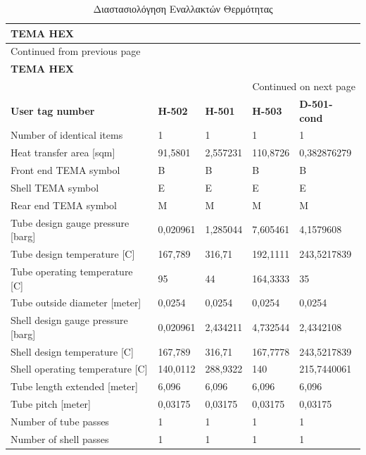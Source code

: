 \documentclass[11pt]{article}
\begin{document}
\begin{longtable}{lllll}
\caption{Διαστασιολόγηση Εναλλακτών Θερμότητας}
\\
\textbf{TEMA HEX} &  &  &  & \\
\hline
\endfirsthead
\multicolumn{5}{l}{Continued from previous page} \\
\hline

\textbf{TEMA HEX} &  &  &  &  \\

\hline
\endhead
\hline\multicolumn{5}{r}{Continued on next page} \\
\endfoot
\endlastfoot
\hline
\textbf{User tag number} & \textbf{H-502} & \textbf{H-501} & \textbf{H-503} & \textbf{D-501-cond}\\
Number of identical items & 1 & 1 & 1 & 1\\
Heat transfer area [sqm] & 91,5801 & 2,557231 & 110,8726 & 0,382876279\\
Front end TEMA symbol & B & B & B & B\\
Shell TEMA symbol & E & E & E & E\\
Rear end TEMA symbol & M & M & M & M\\
Tube design gauge pressure [barg] & 0,020961 & 1,285044 & 7,605461 & 4,1579608\\
Tube design temperature [C] & 167,789 & 316,71 & 192,1111 & 243,5217839\\
Tube operating temperature [C] & 95 & 44 & 164,3333 & 35\\
Tube outside diameter [meter] & 0,0254 & 0,0254 & 0,0254 & 0,0254\\
Shell design gauge pressure [barg] & 0,020961 & 2,434211 & 4,732544 & 2,4342108\\
Shell design temperature [C] & 167,789 & 316,71 & 167,7778 & 243,5217839\\
Shell operating temperature [C] & 140,0112 & 288,9322 & 140 & 215,7440061\\
Tube length extended [meter] & 6,096 & 6,096 & 6,096 & 6,096\\
Tube pitch [meter] & 0,03175 & 0,03175 & 0,03175 & 0,03175\\
Number of tube passes & 1 & 1 & 1 & 1\\
Number of shell passes & 1 & 1 & 1 & 1\\
\end{longtable}
\end{document}
